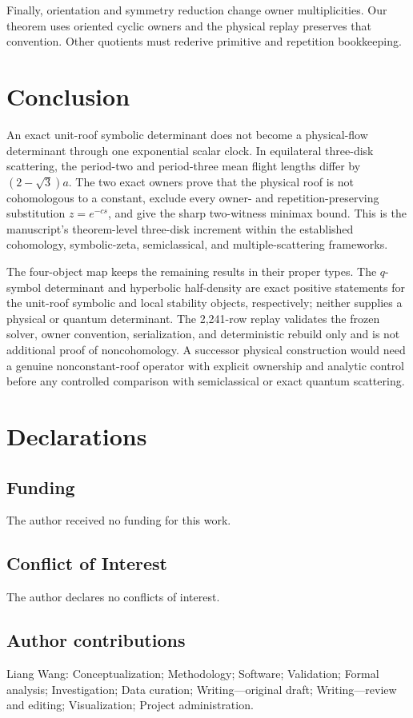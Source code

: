 \documentclass[11pt,a4paper]{article}
\theoremstyle{definition}
\theoremstyle{remark}
\begin{document}
Finally, orientation and symmetry reduction change owner multiplicities. Our theorem uses oriented cyclic owners and the physical replay preserves that convention. Other quotients must rederive primitive and repetition bookkeeping.

\section{Conclusion}

An exact unit-roof symbolic determinant does not become a physical-flow determinant through one exponential scalar clock. In equilateral three-disk scattering, the period-two and period-three mean flight lengths differ by \((2-\sqrt3)a\). The two exact owners prove that the physical roof is not cohomologous to a constant, exclude every owner- and repetition-preserving substitution \(z=e^{-cs}\), and give the sharp two-witness minimax bound. This is the manuscript's theorem-level three-disk increment within the established cohomology, symbolic-zeta, semiclassical, and multiple-scattering frameworks.

The four-object map keeps the remaining results in their proper types. The \(q\)-symbol determinant and hyperbolic half-density are exact positive statements for the unit-roof symbolic and local stability objects, respectively; neither supplies a physical or quantum determinant. The 2,241-row replay validates the frozen solver, owner convention, serialization, and deterministic rebuild only and is not additional proof of noncohomology. A successor physical construction would need a genuine nonconstant-roof operator with explicit ownership and analytic control before any controlled comparison with semiclassical or exact quantum scattering.

\section*{Declarations}
\subsection*{Funding}
The author received no funding for this work.
\subsection*{Conflict of Interest}
The author declares no conflicts of interest.
\subsection*{Author contributions}
Liang Wang: Conceptualization; Methodology; Software; Validation; Formal analysis; Investigation; Data curation; Writing---original draft; Writing---review and editing; Visualization; Project administration.
\end{document}
